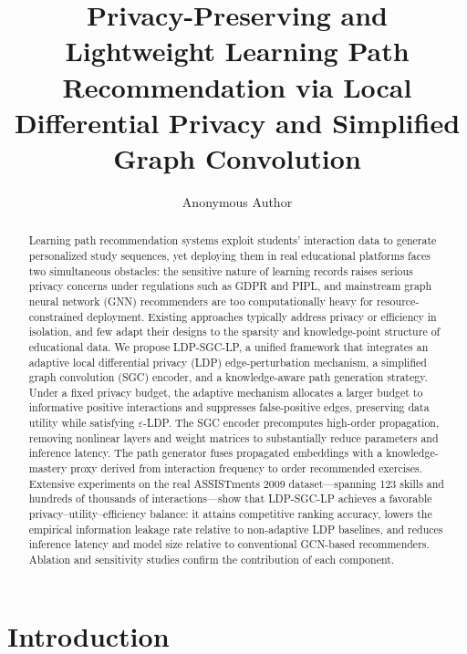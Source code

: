 \documentclass[sn-mathphys]{sn-jnl}
\begin{document}
\title{Privacy-Preserving and Lightweight Learning Path Recommendation via Local Differential Privacy and Simplified Graph Convolution}

\author[1]{Anonymous Author}

\begin{abstract}
Learning path recommendation systems exploit students' interaction data to generate personalized study sequences, yet deploying them in real educational platforms faces two simultaneous obstacles: the sensitive nature of learning records raises serious privacy concerns under regulations such as GDPR and PIPL, and mainstream graph neural network (GNN) recommenders are too computationally heavy for resource-constrained deployment. Existing approaches typically address privacy or efficiency in isolation, and few adapt their designs to the sparsity and knowledge-point structure of educational data. We propose LDP-SGC-LP, a unified framework that integrates an adaptive local differential privacy (LDP) edge-perturbation mechanism, a simplified graph convolution (SGC) encoder, and a knowledge-aware path generation strategy. Under a fixed privacy budget, the adaptive mechanism allocates a larger budget to informative positive interactions and suppresses false-positive edges, preserving data utility while satisfying $\varepsilon$-LDP. The SGC encoder precomputes high-order propagation, removing nonlinear layers and weight matrices to substantially reduce parameters and inference latency. The path generator fuses propagated embeddings with a knowledge-mastery proxy derived from interaction frequency to order recommended exercises. Extensive experiments on the real ASSISTments 2009 dataset---spanning 123 skills and hundreds of thousands of interactions---show that LDP-SGC-LP achieves a favorable privacy--utility--efficiency balance: it attains competitive ranking accuracy, lowers the empirical information leakage rate relative to non-adaptive LDP baselines, and reduces inference latency and model size relative to conventional GCN-based recommenders. Ablation and sensitivity studies confirm the contribution of each component.
\end{abstract}


\section{Introduction}
\label{sec:intro}
\end{document}
